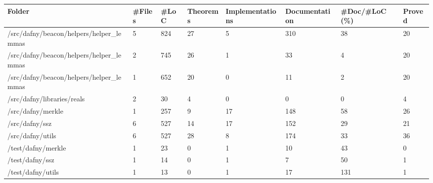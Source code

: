 \documentclass[a4paper, 12pt]{article}
\begin{document}
\vspace{2em}
\begin{tabular}{llllllll}
\toprule
                                  Folder & \#Files & \#LoC & Theorems & Implementations & Documentation & \#Doc/\#LoC (\%) & Proved \\
\midrule
 /src/dafny/beacon/helpers/helper\_lemmas &      5 &  824 &       27 &               5 &           310 &            38 &     20 \\
 /src/dafny/beacon/helpers/helper\_lemmas &      2 &  745 &       26 &               1 &            33 &             4 &     20 \\
 /src/dafny/beacon/helpers/helper\_lemmas &      1 &  652 &       20 &               0 &            11 &             2 &     20 \\
              /src/dafny/libraries/reals &      2 &   30 &        4 &               0 &             0 &             0 &      4 \\
                       /src/dafny/merkle &      1 &  257 &        9 &              17 &           148 &            58 &     26 \\
                          /src/dafny/ssz &      6 &  527 &       14 &              17 &           152 &            29 &     21 \\
                        /src/dafny/utils &      6 &  527 &       28 &               8 &           174 &            33 &     36 \\
                      /test/dafny/merkle &      1 &   23 &        0 &               1 &            10 &            43 &      0 \\
                         /test/dafny/ssz &      1 &   14 &        0 &               1 &             7 &            50 &      1 \\
                       /test/dafny/utils &      1 &   13 &        0 &               1 &            17 &           131 &      1 \\
\bottomrule
\end{tabular}
\end{document}
